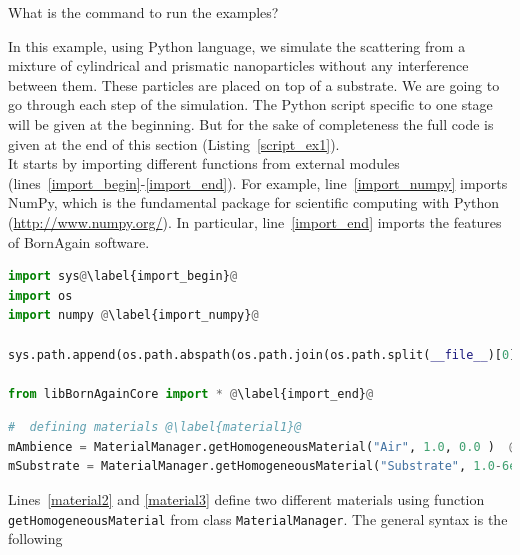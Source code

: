 \noindent What is the command to run the examples?


In this example, using Python language, we simulate the scattering from a mixture of
cylindrical and prismatic nanoparticles without any interference
between them. These particles are placed on top
of a substrate. We are going to go through each step of the
simulation. The Python script specific to one stage will be given at
the beginning. But for the sake of completeness the full code is given
at the end of this section (Listing~\ref{script_ex1}). \\

\noindent It starts by importing different functions from external
modules (lines~\ref{import_begin}-\ref{import_end}). For example,
line~\ref{import_numpy}  imports NumPy, which
is the fundamental package for scientific computing with Python
(\url{http://www.numpy.org/}).  In particular, line~\ref{import_end}
imports the features of BornAgain software.

\begin{lstlisting}[language=python, style=eclipseboxed,name=ex1,nolol]
import sys@\label{import_begin}@
import os
import numpy @\label{import_numpy}@

sys.path.append(os.path.abspath(os.path.join(os.path.split(__file__)[0],'..', '..', '..', 'lib')))

from libBornAgainCore import * @\label{import_end}@

\end{lstlisting}




\begin{lstlisting}[language=python, style=eclipseboxed,name=ex1,nolol]
#  defining materials @\label{material1}@
mAmbience = MaterialManager.getHomogeneousMaterial("Air", 1.0, 0.0 )  @\label{material2}@
mSubstrate = MaterialManager.getHomogeneousMaterial("Substrate", 1.0-6e-6, 2e-8) @\label{material3}@
\end{lstlisting}

\noindent Lines~\ref{material2} and \ref{material3} define two different
materials using function \texttt{getHomogeneousMaterial} from class
\texttt{MaterialManager}. The general syntax is the following 

